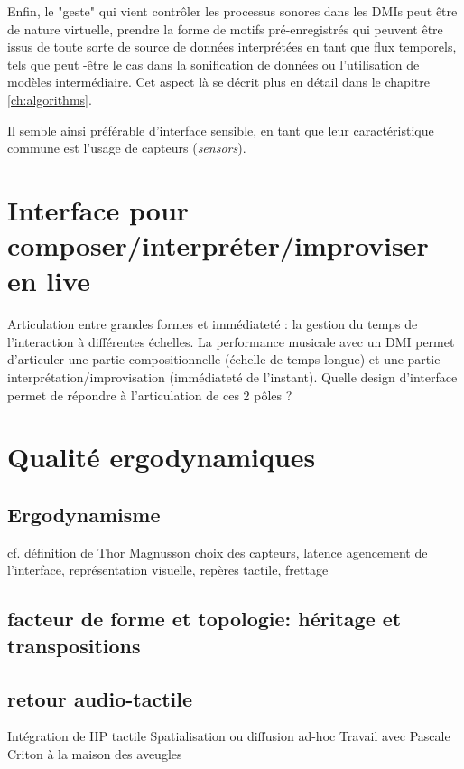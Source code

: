 Enfin, le "geste" qui vient contrôler les processus sonores dans les DMIs peut être de nature virtuelle, prendre la forme de motifs pré-enregistrés qui peuvent être issus de toute sorte de source de données interprétées en tant que flux temporels, tels que peut -être le cas dans la sonification de données ou l'utilisation de modèles intermédiaire. Cet aspect là se décrit plus en détail dans le chapitre \ref{ch:algorithms}.

Il semble ainsi préférable d'interface sensible, en tant que leur caractéristique commune est l'usage de capteurs (\textit{sensors}).

\section{Interface pour composer/interpréter/improviser en live}
Articulation entre grandes formes et immédiateté : la gestion du temps de l’interaction à différentes échelles.
La performance musicale avec un DMI permet d’articuler une partie compositionnelle (échelle de temps longue) et une partie interprétation/improvisation (immédiateté de l’instant). 
Quelle design d’interface permet de répondre à l’articulation de ces 2 pôles ? 

\section{Qualité ergodynamiques}
\subsection{Ergodynamisme}
cf. définition de Thor Magnusson
choix des capteurs, latence
agencement de l’interface, représentation visuelle, repères tactile, frettage


\subsection{facteur de forme et topologie: héritage et transpositions}

\subsection{retour audio-tactile}
Intégration de HP tactile
Spatialisation ou diffusion ad-hoc
Travail avec Pascale Criton à la maison des aveugles



